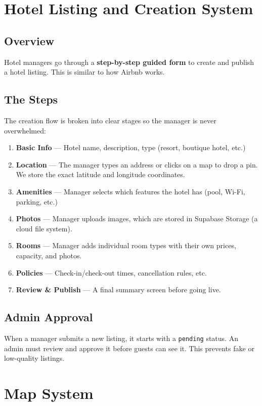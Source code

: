 \documentclass[12pt,a4paper]{article}
\begin{document}
\newpage
\section{Hotel Listing and Creation System}

\subsection{Overview}
Hotel managers go through a \textbf{step-by-step guided form} to create and publish a hotel listing. This is similar to how Airbnb works.

\subsection{The Steps}

The creation flow is broken into clear stages so the manager is never overwhelmed:

\begin{enumerate}
  \item \textbf{Basic Info} --- Hotel name, description, type (resort, boutique hotel, etc.)
  \item \textbf{Location} --- The manager types an address or clicks on a map to drop a pin. We store the exact latitude and longitude coordinates.
  \item \textbf{Amenities} --- Manager selects which features the hotel has (pool, Wi-Fi, parking, etc.)
  \item \textbf{Photos} --- Manager uploads images, which are stored in Supabase Storage (a cloud file system).
  \item \textbf{Rooms} --- Manager adds individual room types with their own prices, capacity, and photos.
  \item \textbf{Policies} --- Check-in/check-out times, cancellation rules, etc.
  \item \textbf{Review \& Publish} --- A final summary screen before going live.
\end{enumerate}

\subsection{Admin Approval}
When a manager submits a new listing, it starts with a \texttt{pending} status. An admin must review and approve it before guests can see it. This prevents fake or low-quality listings.

\newpage
\section{Map System}
\end{document}
